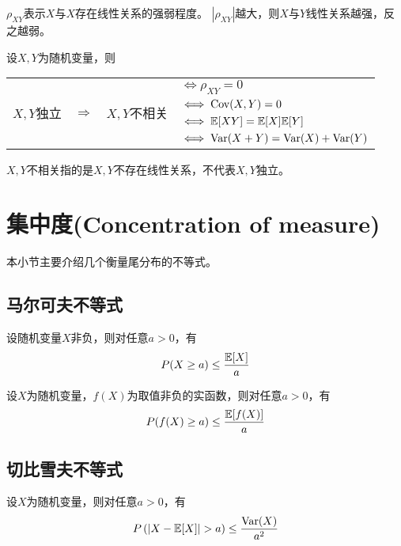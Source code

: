 \begin{remark}
  $\rho_{XY}$表示$X$与$X$存在线性关系的强弱程度。
  $|\rho_{XY}|$越大，则$X$与$Y$线性关系越强，反之越弱。
\end{remark}

\begin{theorem}[独立与不相关]
  设$X,Y$为随机变量，则
  \begin{center}
    \begin{tabular}{cccl}
      \multirow{4}{*}{$X,Y$独立} &
      \multirow{4}{*}{$\Longrightarrow$} &
      \multirow{4}{*}{$X,Y$不相关} &
      $\iff \rho_{XY}=0$ \\
      & & & $\iff \textrm{Cov}(X,Y)=0$ \\
      & & & $\iff \mathbb{E}[XY]=\mathbb{E}[X]\mathbb{E}[Y]$ \\
      & & & $\iff \textrm{Var}(X+Y)=\textrm{Var}(X)+\textrm{Var}(Y)$ \\
    \end{tabular}
  \end{center}
\end{theorem}

\begin{remark}
  $X,Y$不相关指的是$X,Y$不存在线性关系，不代表$X,Y$独立。
\end{remark}

\section{集中度(Concentration of measure)}
本小节主要介绍几个衡量尾分布的不等式。

\subsection{马尔可夫不等式}
\begin{theorem}[马尔科夫不等式]
  设随机变量$X$非负，则对任意$a>0$，有
  \begin{displaymath}
    P(X\ge a) \le \frac{\mathbb{E}[X]}{a}
  \end{displaymath}
\end{theorem}

\begin{theorem}[马尔科夫不等式的推广]
  设$X$为随机变量，$f(X)$为取值非负的实函数，则对任意$a>0$，有
  \begin{displaymath}
    P(f(X)\ge a) \le \frac{\mathbb{E}[f(X)]}{a}
  \end{displaymath}
\end{theorem}

\subsection{切比雪夫不等式}
\begin{theorem}[切比雪夫不等式]
  设$X$为随机变量，则对任意$a>0$，有
  \begin{displaymath}
    P\left(|X-\mexpect[X]|>a\right) \le \frac{\mvar(X)}{a^2}
  \end{displaymath}
\end{theorem}